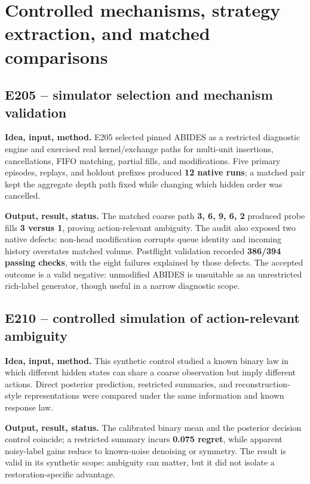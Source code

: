 \documentclass[10pt,a4paper]{article}
\begin{document}
\section{Controlled mechanisms, strategy extraction, and matched comparisons}
\subsection{E205 -- simulator selection and mechanism validation}
\textbf{Idea, input, method.} E205 selected pinned ABIDES as a restricted diagnostic engine and exercised real kernel/exchange paths for multi-unit insertions, cancellations, FIFO matching, partial fills, and modifications. Five primary episodes, replays, and holdout prefixes produced \textbf{12 native runs}; a matched pair kept the aggregate depth path fixed while changing which hidden order was cancelled.\par
\textbf{Output, result, status.} The matched coarse path \textbf{3, 6, 9, 6, 2} produced probe fills \textbf{3 versus 1}, proving action-relevant ambiguity. The audit also exposed two native defects: non-head modification corrupts queue identity and incoming history overstates matched volume. Postflight validation recorded \textbf{386/394 passing checks}, with the eight failures explained by those defects. The accepted outcome is a valid negative: unmodified ABIDES is unsuitable as an unrestricted rich-label generator, though useful in a narrow diagnostic scope.\par
\subsection{E210 -- controlled simulation of action-relevant ambiguity}
\textbf{Idea, input, method.} This synthetic control studied a known binary law in which different hidden states can share a coarse observation but imply different actions. Direct posterior prediction, restricted summaries, and reconstruction-style representations were compared under the same information and known response law.\par
\textbf{Output, result, status.} The calibrated binary mean and the posterior decision control coincide; a restricted summary incurs \textbf{0.075 regret}, while apparent noisy-label gains reduce to known-noise denoising or symmetry. The result is valid in its synthetic scope: ambiguity can matter, but it did not isolate a restoration-specific advantage.\par
\end{document}
